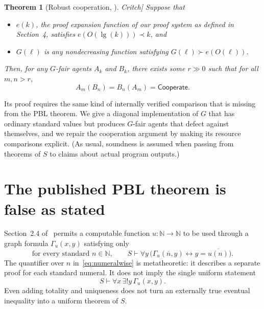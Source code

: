 \documentclass[11pt]{article}
\newtheorem*{critchcooperation}{Theorem}
\theoremstyle{definition}
\theoremstyle{remark}
\newcommand{\N}{\mathbb{N}}
\newcommand{\Coop}{\mathsf{Cooperate}}
\newcommand{\CritchCooperationRef}{\cite[Theorem~5.1]{Critch}}
\begin{document}
\begin{critchcooperation}[Robust cooperation, \CritchCooperationRef]
Suppose that
\begin{itemize}[leftmargin=1.8em]
  \item $e(k)$, the proof expansion function of our proof system as defined in Section~4, satisfies $e(O(\lg(k)))\prec k$, and
  \item $G(\ell)$ is any nondecreasing function satisfying $G(\ell)\succ e(O(\ell))$.
\end{itemize}
Then, for any $G$-fair agents $A_k$ and $B_k$, there exists some $r\gg 0$ such that for all $m,n>r$,
\[
  A_m(B_n)=B_n(A_m)=\Coop.
\]
\end{critchcooperation}

Its proof requires the same kind of internally verified comparison that is missing from the PBL theorem.  We give a diagonal implementation of $G$ that has ordinary standard values but produces $G$-fair agents that defect against themselves, and we repair the cooperation argument by making its resource comparisons explicit.  (As usual, soundness is assumed when passing from theorems of $S$ to claims about actual program outputs.)

\section{The published PBL theorem is false as stated}\label{sec:pbl-refutation}

Section~2.4 of~\cite{Critch} permits a computable function $u:\N\to\N$ to be used through a graph formula $\Gamma_u(x,y)$ satisfying only
\begin{equation}\label{eq:numeralwise}
  \text{for every standard }n\in\N,\qquad
  S\vdash \forall y\,
  \bigl(\Gamma_u(\overline n,y)\leftrightarrow y=\overline{u(n)}\bigr).
\end{equation}
The quantifier over $n$ in~\eqref{eq:numeralwise} is metatheoretic: it describes a separate proof for each standard numeral.  It does not imply the single uniform statement
\[
  S\vdash\forall x\,\exists!y\,\Gamma_u(x,y).
\]
Even adding totality and uniqueness does not turn an externally true eventual inequality into a uniform theorem of $S$.
\end{document}
